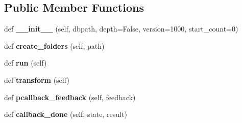 \subsection*{Public Member Functions}
\begin{DoxyCompactItemize}
\item 
\mbox{\label{classsim__animation_1_1sim__animation_1_1sim__animation__manager_1_1SimAnimationManager_a96bcbc70a4d2b49416efcd07426a4a62}} 
def {\bfseries \+\_\+\+\_\+init\+\_\+\+\_\+} (self, dbpath, depth=False, version=1000, start\+\_\+count=0)
\item 
\mbox{\label{classsim__animation_1_1sim__animation_1_1sim__animation__manager_1_1SimAnimationManager_a841f73e4713ba5aad73fd343bb7a48b0}} 
def {\bfseries create\+\_\+folders} (self, path)
\item 
\mbox{\label{classsim__animation_1_1sim__animation_1_1sim__animation__manager_1_1SimAnimationManager_af7d3becd15b45e5e01ba9e8c2e2f2ed3}} 
def {\bfseries run} (self)
\item 
\mbox{\label{classsim__animation_1_1sim__animation_1_1sim__animation__manager_1_1SimAnimationManager_ad4770e4256f4b855e2231c487b06a586}} 
def {\bfseries transform} (self)
\item 
\mbox{\label{classsim__animation_1_1sim__animation_1_1sim__animation__manager_1_1SimAnimationManager_a47fb1cedc891232cb1e8578b40e16f8a}} 
def {\bfseries pcallback\+\_\+feedback} (self, feedback)
\item 
\mbox{\label{classsim__animation_1_1sim__animation_1_1sim__animation__manager_1_1SimAnimationManager_af5bc444e0915201e0e856c11877c2a59}} 
def {\bfseries callback\+\_\+done} (self, state, result)
\end{DoxyCompactItemize}
